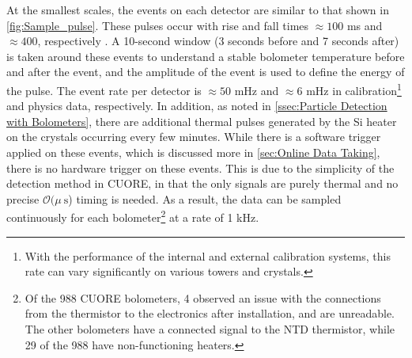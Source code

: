 At the smallest scales, the events on each detector are similar to that shown in \autoref{fig:Sample_pulse}.
These pulses occur with rise and fall times $\approx100$ ms and $\approx400$, respectively \cite{Alduino:2017ehq}.
A 10-second window (3 seconds before and 7 seconds after) is taken around these events to understand a stable bolometer temperature before and after the event, and the amplitude of the event is used to define the energy of the pulse.
The event rate per detector is $\approx 50$ mHz and $\approx6$ mHz in calibration\footnote{With the performance of the internal and external calibration systems, this rate can vary significantly on various towers and crystals.} and physics data, respectively.
In addition, as noted in \autoref{ssec:Particle Detection with Bolometers}, there are additional thermal pulses generated by the Si heater on the crystals occurring every few minutes.
While there is a software trigger applied on these events, which is discussed more in \autoref{sec:Online Data Taking}, there is no hardware trigger on these events.
This is due to the simplicity of the detection method in CUORE, in that the only signals are purely thermal and no precise $\mathcal{O}(\mu~\textrm{s}$) timing is needed.
As a result, the data can be sampled continuously for each bolometer\footnote{Of the 988 CUORE bolometers, 4 observed an issue with the connections from the thermistor to the electronics after installation, and are unreadable.
The other bolometers have a connected signal to the NTD thermistor, while 29 of the 988 have non-functioning heaters.} at a rate of 1 kHz.

